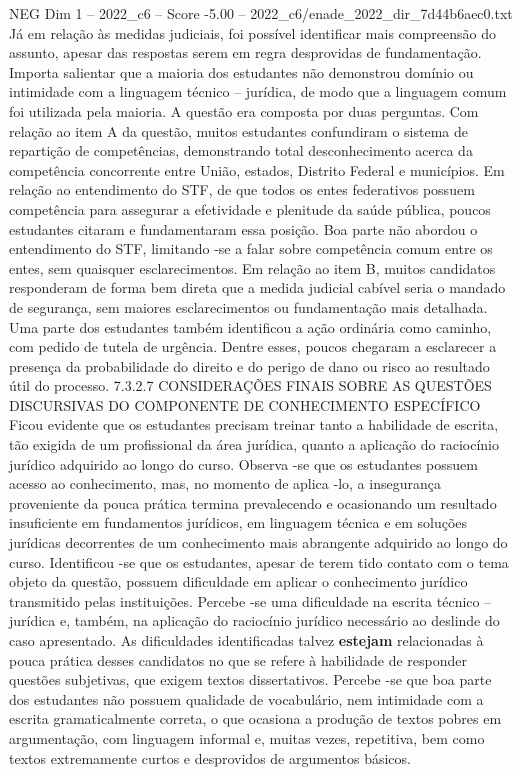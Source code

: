 \begin{textsample}{NEG Dim 1 – 2022\_c6 – Score -5.00 – 2022\_c6/enade\_2022\_dir\_7d44b6aec0.txt}
Já em relação às medidas judiciais, foi possível identificar mais compreensão do assunto, apesar das respostas serem em regra desprovidas de fundamentação.
Importa salientar que a maioria dos estudantes não demonstrou domínio ou intimidade com a linguagem técnico – jurídica, de modo que a linguagem comum foi utilizada pela maioria.
A questão era composta por duas perguntas.
Com relação ao item A da questão, muitos estudantes confundiram o sistema de repartição de competências, demonstrando total desconhecimento acerca da competência concorrente entre União, estados, Distrito Federal e municípios.
Em relação ao entendimento do STF, de que todos os entes federativos possuem competência para assegurar a efetividade e plenitude da saúde pública, poucos estudantes citaram e fundamentaram essa posição.
Boa parte não abordou o entendimento do STF, limitando -se a falar sobre competência comum entre os entes, sem quaisquer esclarecimentos.
Em relação ao item B, muitos candidatos responderam de forma bem direta que a medida judicial cabível seria o mandado de segurança, sem maiores esclarecimentos ou fundamentação mais detalhada.
Uma parte dos estudantes também identificou a ação ordinária como caminho, com pedido de tutela de urgência.
Dentre esses, poucos chegaram a esclarecer a presença da probabilidade do direito e do perigo de dano ou risco ao resultado útil do processo. 7.3.2.7 CONSIDERAÇÕES FINAIS SOBRE AS QUESTÕES DISCURSIVAS DO COMPONENTE DE CONHECIMENTO ESPECÍFICO Ficou evidente que os estudantes precisam treinar tanto a habilidade de escrita, tão exigida de um profissional da área jurídica, quanto a aplicação do raciocínio jurídico adquirido ao longo do curso.
Observa -se que os estudantes possuem acesso ao conhecimento, mas, no momento de aplica -lo, a insegurança proveniente da pouca prática termina prevalecendo e ocasionando um resultado insuficiente em fundamentos jurídicos, em linguagem técnica e em soluções jurídicas decorrentes de um conhecimento mais abrangente adquirido ao longo do curso.
Identificou -se que os estudantes, apesar de terem tido contato com o tema objeto da questão, possuem dificuldade em aplicar o conhecimento jurídico transmitido pelas instituições.
Percebe -se uma dificuldade na escrita técnico – jurídica e, também, na aplicação do raciocínio jurídico necessário ao deslinde do caso apresentado.
As dificuldades identificadas talvez \textbf{estejam} relacionadas à pouca prática desses candidatos no que se refere à habilidade de responder questões subjetivas, que exigem textos dissertativos.
Percebe -se que boa parte dos estudantes não possuem qualidade de vocabulário, nem intimidade com a escrita gramaticalmente correta, o que ocasiona a produção de textos pobres em argumentação, com linguagem informal e, muitas vezes, repetitiva, bem como textos extremamente curtos e desprovidos de argumentos básicos.

\end{textsample}
